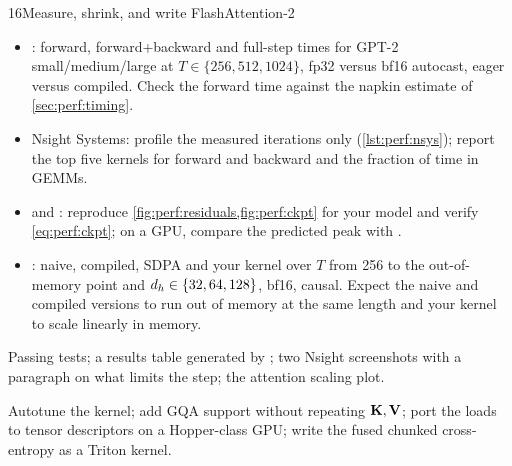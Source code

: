 \begin{labbox}{16}{Measure, shrink, and write FlashAttention-2}
\begin{itemize}
\item {}: forward, forward+backward and full-step times for GPT-2 small/medium/large at
  $T\in\{256,512,1024\}$, fp32 versus bf16 autocast, eager versus compiled. Check the forward time
  against the napkin estimate of \cref{sec:perf:timing}.
\item Nsight Systems: profile the measured iterations only (\cref{lst:perf:nsys}); report the top five
  kernels for forward and backward and the fraction of time in GEMMs.
\item {} and : reproduce \cref{fig:perf:residuals,fig:perf:ckpt} for
  your model and verify \cref{eq:perf:ckpt}; on a GPU, compare the predicted peak with
  .
\item {}: naive, compiled, SDPA and your kernel over $T$ from 256 to the
  out-of-memory point and $d_{h}\in\{32,64,128\}$, bf16, causal. Expect the naive and compiled
  versions to run out of memory at the same length and your kernel to scale linearly in memory.
\end{itemize}

Passing tests; a results table generated by ; two Nsight screenshots
with a paragraph on what limits the step; the attention scaling plot.

Autotune the kernel; add GQA support without repeating $\mathbf{K},\mathbf{V}$; port the loads to tensor
descriptors on a Hopper-class GPU; write the fused chunked cross-entropy as a Triton kernel.
\end{labbox}

